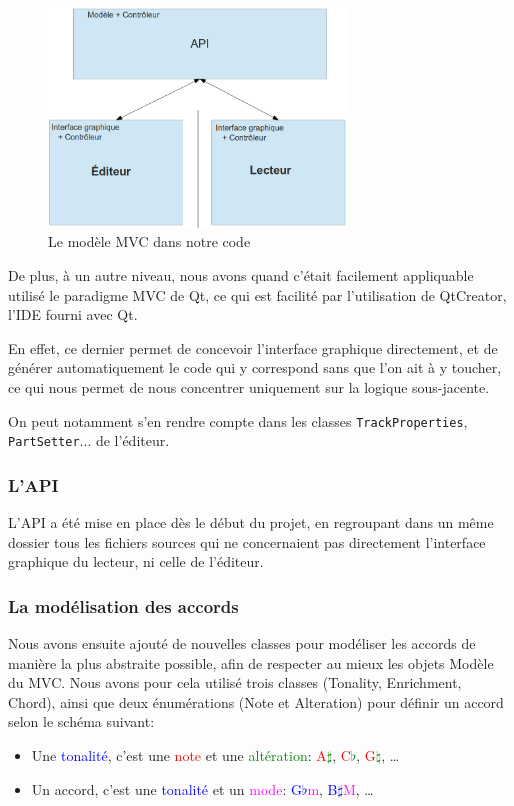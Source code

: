 \documentclass[a4paper,11pt]{article}
\begin{document}
\begin{figure}[H]
\begin{center}
\includegraphics[width=300px]{mvc.png}
\caption{Le modèle MVC dans notre code}
\label{mvc}
\end{center}
\end{figure}


De plus, à un autre niveau, nous avons quand c'était facilement appliquable utilisé le paradigme MVC de Qt, ce qui est facilité
par l'utilisation de QtCreator, l'IDE fourni avec Qt.

En effet, ce dernier permet de concevoir l'interface graphique directement, et de générer automatiquement le code qui y
correspond sans que l'on ait à y toucher, ce qui nous permet de nous concentrer uniquement sur la logique sous-jacente.

On peut notamment s'en rendre compte dans les classes \texttt{TrackProperties}, \texttt{PartSetter}... de l'éditeur.
\subsubsection{L'API}

L'API a été mise en place dès le début du projet, en regroupant dans un même dossier tous les fichiers sources qui ne concernaient pas directement l'interface graphique du lecteur, ni celle de l'éditeur.

\subsubsection*{La modélisation des accords}

Nous avons ensuite ajouté de nouvelles classes pour modéliser les accords de manière la plus abstraite possible, afin de respecter au mieux les objets Modèle du MVC. Nous avons pour cela utilisé trois classes (Tonality, Enrichment, Chord), ainsi que deux énumérations (Note et Alteration) pour définir un accord selon le schéma suivant:
\begin{itemize}
 \item Une \textcolor{blue}{tonalité}, c'est une \textcolor{red}{note} et une \textcolor{green}{altération}: \textcolor{red}{A}\textcolor{green}{$\sharp$}, \textcolor{red}{C}\textcolor{green}{$\flat$}, \textcolor{red}{G}\textcolor{green}{$\natural$}, \dots
 \item Un accord, c'est une \textcolor{blue}{tonalité} et un \textcolor{magenta}{mode}: \textcolor{blue}{G$\flat$}\textcolor{magenta}{m}, \textcolor{blue}{B$\sharp$}\textcolor{magenta}{M}, \dots
\end{itemize}
\end{document}
